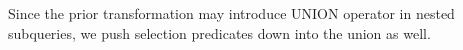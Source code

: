 
%


 Since the prior transformation may introduce UNION operator in nested subqueries, we push selection predicates down into the union as well.

